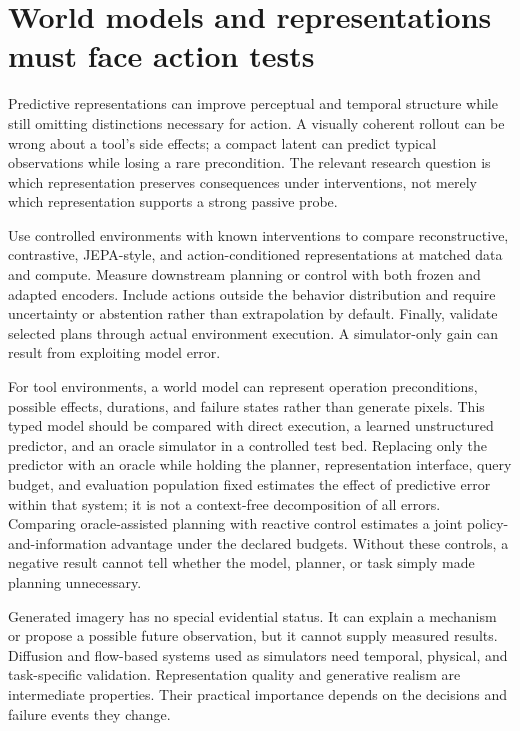 \section{World models and representations must face action tests}\label{sec:C34:05}
Predictive representations can improve perceptual and temporal structure while still omitting distinctions necessary for action. A visually coherent rollout can be wrong about a tool's side effects; a compact latent can predict typical observations while losing a rare precondition. The relevant research question is which representation preserves consequences under interventions, not merely which representation supports a strong passive probe.

Use controlled environments with known interventions to compare reconstructive, contrastive, JEPA-style, and action-conditioned representations at matched data and compute. Measure downstream planning or control with both frozen and adapted encoders. Include actions outside the behavior distribution and require uncertainty or abstention rather than extrapolation by default. Finally, validate selected plans through actual environment execution. A simulator-only gain can result from exploiting model error.

For tool environments, a world model can represent operation preconditions, possible effects, durations, and failure states rather than generate pixels. This typed model should be compared with direct execution, a learned unstructured predictor, and an oracle simulator in a controlled test bed. Replacing only the predictor with an oracle while holding the planner, representation interface, query budget, and evaluation population fixed estimates the effect of predictive error within that system; it is not a context-free decomposition of all errors. Comparing oracle-assisted planning with reactive control estimates a joint policy-and-information advantage under the declared budgets. Without these controls, a negative result cannot tell whether the model, planner, or task simply made planning unnecessary.

Generated imagery has no special evidential status. It can explain a mechanism or propose a possible future observation, but it cannot supply measured results. Diffusion and flow-based systems used as simulators need temporal, physical, and task-specific validation. Representation quality and generative realism are intermediate properties. Their practical importance depends on the decisions and failure events they change.

